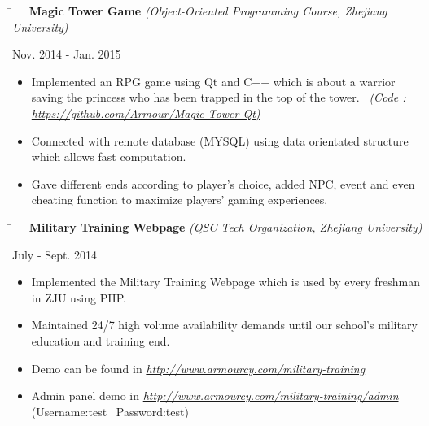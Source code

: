 \documentclass[10pt]{article} %
\begin{document}
\parbox{0.5\textwidth}{
\begin{tabbing}
\hspace{4mm} \= \kill
\>\textbf{\ \ Magic Tower Game} \textit{(Object-Oriented Programming Course, Zhejiang University)}
\end{tabbing}
}
\hfill
\parbox{0.5\textwidth}{
\begin{tabbing}
Nov. 2014 - Jan. 2015
\end{tabbing}
}
\vspace{-3mm}
\begin{itemize}[leftmargin=16mm]
        \item Implemented an RPG game using Qt and C++ which is about a warrior saving the princess who has been trapped in the top of the tower. \ \textit{(Code : \underline{https://github.com/Armour/Magic-Tower-Qt)}}
        \item Connected with remote database (MYSQL) using data orientated structure which allows fast computation.
        \item Gave different ends according to player's choice, added NPC, event and even cheating function to maximize players' gaming experiences. 

\end{itemize}

\parbox{0.5\textwidth}{
\begin{tabbing}
\hspace{4mm} \= \kill
\>\textbf{\ \ Military Training Webpage} \textit{(QSC Tech Organization, Zhejiang University)}
\end{tabbing}
}
\hfill
\parbox{0.5\textwidth}{
\begin{tabbing}
July - Sept. 2014
\end{tabbing}
}
\vspace{-3mm}
\begin{itemize}[leftmargin=16mm]
        \item Implemented the Military Training Webpage which is used by every freshman in ZJU using PHP.
        \item Maintained 24/7 high volume availability demands until our school's military education and training end.
        \item Demo can be found in \textit{\underline{http://www.armourcy.com/military-training}}
        \item Admin panel demo in \textit{\underline{http://www.armourcy.com/military-training/admin}} (Username:test \  Password:test)
\end{itemize}
\end{document}
